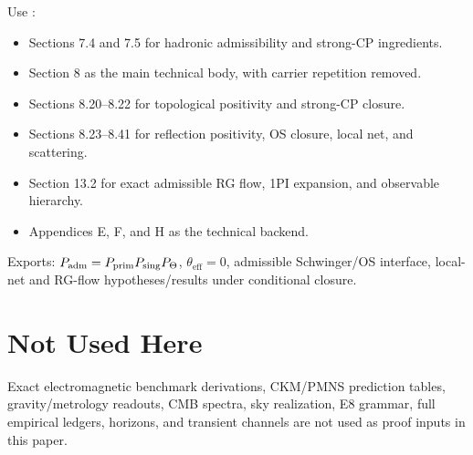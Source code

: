 \documentclass[11pt,a4paper]{article}
\begin{document}
\begin{tfptsourcebox}
Use \sourceDraft:
\begin{itemize}[leftmargin=1.5em]
    \item Sections 7.4 and 7.5 for hadronic admissibility and strong-CP ingredients.
    \item Section 8 as the main technical body, with carrier repetition removed.
    \item Sections 8.20--8.22 for topological positivity and strong-CP closure.
    \item Sections 8.23--8.41 for reflection positivity, OS closure, local net, and scattering.
    \item Section 13.2 for exact admissible RG flow, 1PI expansion, and observable hierarchy.
    \item Appendices E, F, and H as the technical backend.
\end{itemize}
\end{tfptsourcebox}


\begin{tfptexports}
Exports: $P_{\mathrm{adm}}=P_{\mathrm{prim}} P_{\mathrm{sing}}P_\Theta$, $\theta_{\mathrm{eff}}=0$, admissible Schwinger/OS interface, local-net and RG-flow hypotheses/results under conditional closure.
\end{tfptexports}

\section{Not Used Here}

Exact electromagnetic benchmark derivations, CKM/PMNS prediction tables, gravity/metrology
readouts, CMB spectra, sky realization, E8 grammar, full empirical ledgers, horizons, and transient
channels are not used as proof inputs in this paper.
\end{document}
